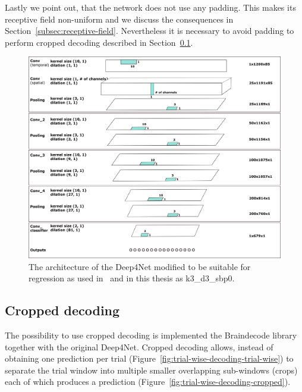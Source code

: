 Lastly we point out, that the network does not use any padding. 
This makes its receptive field non-uniform and we discuss the consequences in Section~\ref{subsec:receptive-field}.
Nevertheless it is necessary to avoid padding to perform cropped decoding described in Section~\ref{subsec:cropped-decoding}.

\begin{figure}[!htbp]
\centering
\includegraphics[width=\linewidth]{img/ch3/architektura.png}
\caption[Deep4Net architecture]{The architecture of the Deep4Net modified to be suitable for regression as used in~\cite{Hammer-2021} and in this thesis as k3\_d3\_sbp0.}
\label{fig:architecture}
\end{figure}

\subsection{Cropped decoding}\label{subsec:cropped-decoding}
The possibility to use cropped decoding is implemented the Braindecode library together with the original Deep4Net.
Cropped decoding allows, instead of obtaining one prediction per trial (Figure~\ref{fig:trial-wise-decoding-trial-wise}) to separate the trial window into multiple smaller overlapping sub-windows (crops) each of which produces a prediction (Figure~\ref{fig:trial-wise-decoding-cropped}).

